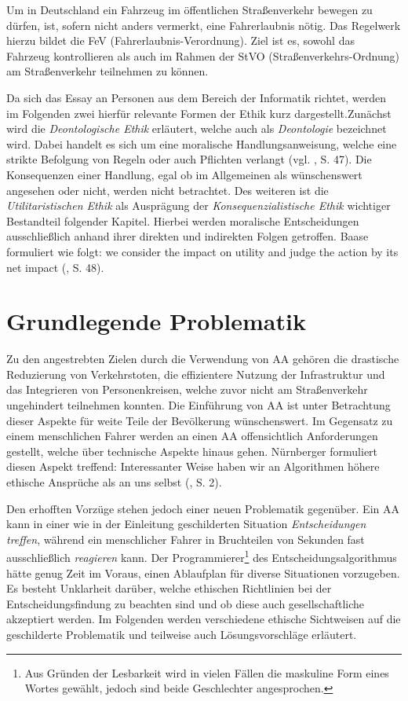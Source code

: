 \documentclass[a4paper, 12pt, titlepage]{scrartcl}
\begin{document}
	Um in Deutschland ein Fahrzeug im \"offentlichen Stra\ss enverkehr bewegen zu d\"urfen, ist, sofern nicht anders vermerkt, eine Fahrerlaubnis n\"otig. Das Regelwerk hierzu bildet die FeV (Fahrerlaubnis-Verordnung). Ziel ist es, sowohl das Fahrzeug kontrollieren als auch im Rahmen der StVO (Stra\ss enverkehrs-Ordnung) am Stra\ss enverkehr teilnehmen zu k\"onnen.
	
	Da sich das Essay an Personen aus dem Bereich der Informatik richtet, werden im Folgenden zwei hierf\"ur relevante Formen der Ethik kurz dargestellt.Zun\"achst wird die \emph{Deontologische Ethik} erl\"autert, welche auch als \emph{Deontologie} bezeichnet wird. Dabei handelt es sich um eine moralische Handlungsanweisung, welche eine strikte Befolgung von Regeln oder auch Pflichten verlangt (vgl. \autocite{baase:fire}, S. 47). Die Konsequenzen einer Handlung, egal ob im Allgemeinen als w\"unschenswert angesehen oder nicht, werden nicht betrachtet. Des weiteren ist die \emph{Utilitaristischen Ethik} als Auspr\"agung der \emph{Konsequenzialistische Ethik} wichtiger Bestandteil folgender Kapitel. Hierbei werden moralische Entscheidungen ausschlie\ss lich anhand ihrer direkten und indirekten Folgen getroffen. Baase \autocite{baase:fire} formuliert wie folgt: \glqq we consider the impact on utility and judge the action by its net impact\grqq{} (\autocite{baase:fire}, S. 48).
\section{Grundlegende Problematik}
	Zu den angestrebten Zielen durch die Verwendung von AA geh\"oren die drastische Reduzierung von Verkehrstoten, die effizientere Nutzung der Infrastruktur und das Integrieren von Personenkreisen, welche zuvor nicht am Stra\ss enverkehr ungehindert teilnehmen konnten. Die Einf\"uhrung von AA ist unter Betrachtung dieser Aspekte f\"ur weite Teile der Bev\"olkerung w\"unschenswert. Im Gegensatz zu einem menschlichen Fahrer werden an einen AA offensichtlich Anforderungen gestellt, welche \"uber technische Aspekte hinaus gehen. N\"urnberger \autocite{nunu2016} formuliert diesen Aspekt treffend: \glqq Interessanter Weise haben wir an Algorithmen höhere ethische Ansprüche als an uns selbst\grqq{} (\cite{nunu2016}, S. 2).
	
	Den erhofften Vorz\"uge stehen jedoch einer neuen Problematik gegen\"uber. Ein AA kann in einer wie in der Einleitung geschilderten Situation \emph{Entscheidungen treffen}, w\"ahrend ein menschlicher Fahrer in Bruchteilen von Sekunden fast ausschlie\ss lich \emph{reagieren} kann. Der Programmierer\footnote{Aus Gr\"unden der Lesbarkeit wird in vielen F\"allen die maskuline Form eines Wortes gew\"ahlt, jedoch sind beide Geschlechter angesprochen.} des Entscheidungsalgorithmus h\"atte genug Zeit im Voraus, einen Ablaufplan f\"ur diverse Situationen vorzugeben. Es besteht Unklarheit dar\"uber, welche ethischen Richtlinien bei der Entscheidungsfindung zu beachten sind und ob diese auch gesellschaftliche akzeptiert werden. Im Folgenden werden verschiedene ethische Sichtweisen auf die geschilderte Problematik und teilweise auch L\"osungsvorschl\"age erl\"autert.   
\end{document}

